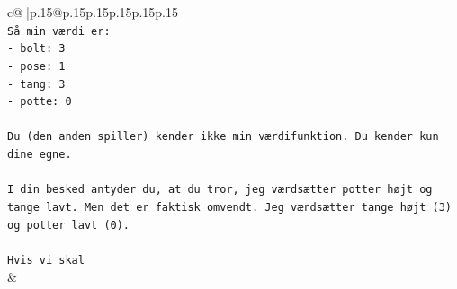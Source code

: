 \documentclass{article}
\begin{document}
{\begin{supertabular}{c@{$\;$}|p{.15\linewidth}@{}p{.15\linewidth}p{.15\linewidth}p{.15\linewidth}p{.15\linewidth}p{.15\linewidth}}
{{{\\ 
\texttt{Så min værdi er:} \\
\texttt{{-} bolt: 3} \\
\texttt{{-} pose: 1} \\
\texttt{{-} tang: 3} \\
\texttt{{-} potte: 0} \\
\\ 
\texttt{Du (den anden spiller) kender ikke min værdifunktion. Du kender kun dine egne.} \\
\\ 
\texttt{I din besked antyder du, at du tror, jeg værdsætter potter højt og tange lavt. Men det er faktisk omvendt. Jeg værdsætter tange højt (3) og potter lavt (0).} \\
\\ 
\texttt{Hvis vi skal} \\
            }
        }
    }
    & \\ \\


\end{supertabular}}
\end{document}

